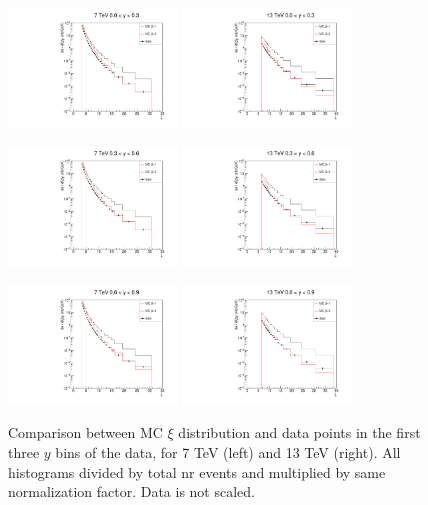 \documentclass{article}
\begin{document}
\begin{figure}[h!]
\centering
\includegraphics[width = 0.4\textwidth]{xi_7_y1.pdf}
\includegraphics[width = 0.4\textwidth]{xi_13_y1.pdf}

\includegraphics[width = 0.4\textwidth]{xi_7_y2.pdf}
\includegraphics[width = 0.4\textwidth]{xi_13_y2.pdf}

\includegraphics[width = 0.4\textwidth]{xi_7_y3.pdf}
\includegraphics[width = 0.4\textwidth]{xi_13_y3.pdf}
\caption{Comparison between MC $\xi$ distribution and data points in the first three $y$ bins of the data, for 7 TeV (left) and 13 TeV (right). All histograms divided by total nr events and multiplied by same normalization factor. Data is not scaled.}\label{f:xi_comp_1}
\end{figure}
\end{document}
